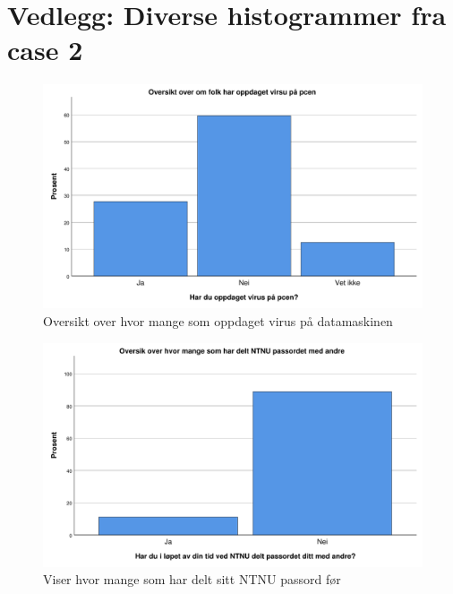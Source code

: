 \chapter{Vedlegg: Diverse histogrammer fra case 2}
\begin{figure}[H]
    \centering
    \includegraphics[scale=0.5]{case_2/bilder/spss/oppdaget_virus.pdf}
    \caption[Oppdaget virus]{Oversikt over hvor mange som oppdaget virus på datamaskinen}
    \label{fig:oppdaget-virus}
\end{figure}

\begin{figure}[H]
    \centering
    \includegraphics[scale=0.5]{case_2/bilder/spss/passord_deling.pdf}
    \caption[Oversikt over passorddeling]{Viser hvor mange som har delt sitt NTNU passord før}
    \label{fig:passord-deling}
\end{figure}

